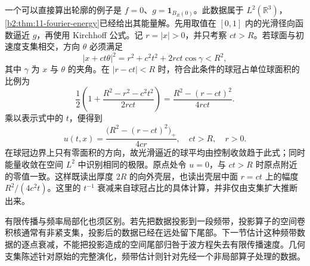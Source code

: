 一个可以直接算出轮廓的例子是 \(f=0\)、\(g=\mathbf1_{B_R(0)}\)。此数据属于 \(L^2(\mathbb R^3)\)，\cref{b2:thm:11-fourier-energy}已经给出其能量解。先用取值在 \([0,1]\) 内的光滑径向函数逼近 \(g\)，再使用 Kirchhoff 公式。记 \(r=|x|>0\)，并只考察 \(ct>R\)。若球面与初速度支集相交，方向 \(\theta\) 必须满足
\[
 |x+ct\theta|^2=r^2+c^2t^2+2rct\cos\gamma<R^2,
\]
其中 \(\gamma\) 为 \(x\) 与 \(\theta\) 的夹角。在 \(|r-ct|<R\) 时，符合此条件的球冠占单位球面积的比例为
\[
 \dfrac12\left(1+\dfrac{R^2-r^2-c^2t^2}{2rct}\right)
 =\dfrac{R^2-(r-ct)^2}{4rct}.
\]
乘以表示式中的 \(t\)，便得到
\[
 u(t,x)=\dfrac{\bigl(R^2-(r-ct)^2\bigr)_+}{4cr},
 \quad ct>R,\quad r>0.
\]
在球冠边界上只有零面积的方向，故光滑逼近的球平均由控制收敛趋于此式；同时能量收敛在空间 \(L^2\) 中识别相同的极限。原点处令 \(u=0\)，与 \(ct>R\) 时原点附近的零值一致。这样既读出厚度 \(2R\) 的向外壳层，也读出壳层中面 \(r=ct\) 上的幅度 \(R^2/(4c^2t)\)。这里的 \(t^{-1}\) 衰减来自球冠占比的具体计算，并非仅由支集扩大推断出来。

\ProseParagraphBreak

有限传播与频率局部化也须区别。若先把数据投影到一段频带，投影算子的空间卷积核通常有非紧支集，投影后的数据已经在远处留下尾部。下一节估计这种频带数据的逐点衰减，不能把投影造成的空间尾部归咎于波方程失去有限传播速度。几何支集陈述针对原始的完整演化，频带估计则针对先经一个非局部算子处理的数据。

